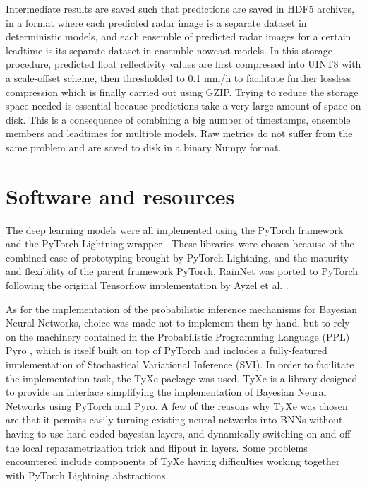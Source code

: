  Intermediate results are saved such that predictions are saved in HDF5 archives, in a format where each predicted radar image is a separate dataset in deterministic models, and each ensemble of predicted radar images for a certain leadtime is its separate dataset in ensemble nowcast models. In this storage procedure, predicted float reflectivity values are first compressed into UINT8 with a scale-offset scheme, then thresholded to 0.1 mm/h to facilitate further lossless compression which is finally carried out using GZIP. Trying to reduce the storage space needed is essential because predictions take a very large amount of space on disk. This is a consequence of combining a big number of timestamps, ensemble members and leadtimes for multiple models. Raw metrics do not suffer from the same problem and are saved to disk in a binary Numpy format.  
 
\section{Software and resources}


The deep learning models were all implemented using the PyTorch framework and the PyTorch Lightning wrapper \cite{Falcon_PyTorch_Lightning_2019}. These libraries were chosen because of the combined ease of prototyping brought by PyTorch Lightning, and the maturity and flexibility of the parent framework PyTorch. RainNet was ported to PyTorch following the original Tensorflow implementation by Ayzel et al. \cite{Ayzel2020RainNet}. 

As for the implementation of the probabilistic inference mechanisms for Bayesian Neural Networks, choice was made not to implement them by hand, but to rely on the machinery contained in the Probabilistic Programming Language (PPL) Pyro \cite{bingham2018pyro}, which is itself built on top of PyTorch and includes a fully-featured implementation of Stochastical Variational Inference (SVI). In order to facilitate the implementation task, the TyXe package \cite{ritter2021tyxe} was used. TyXe is a library designed to provide an interface simplifying the implementation of Bayesian Neural Networks using PyTorch and Pyro. A few of the reasons why TyXe was chosen are that it permits easily turning existing neural networks into BNNs without having to use hard-coded bayesian layers, and dynamically switching on-and-off the local reparametrization trick and flipout in layers. Some problems encountered include components of TyXe having difficulties working together with PyTorch Lightning abstractions.

